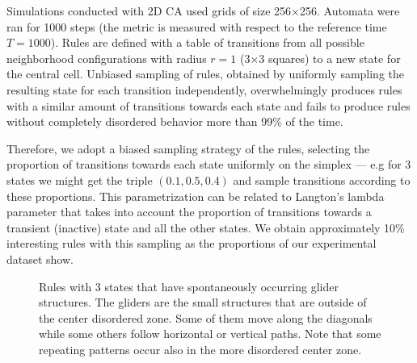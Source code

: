Simulations conducted with 2D CA used grids of size 256$\times$256. Automata
were ran for 1000 steps (the metric is measured with respect to the reference
time $T = 1000$). Rules are defined with a table of transitions from all
possible neighborhood configurations with radius $r=1$ (3$\times$3 squares) to a
new state for the central cell. Unbiased sampling of rules, obtained by
uniformly sampling the resulting state for each transition independently,
overwhelmingly produces rules with a similar amount of transitions towards each
state and fails to produce rules without completely disordered behavior more
than 99\% of the time.

Therefore, we adopt a biased sampling strategy of the rules, selecting the
proportion of transitions towards each state uniformly on the simplex --- e.g
for 3 states we might get the triple $(0.1, 0.5, 0.4)$ and sample transitions
according to these proportions. This parametrization can be related to Langton's
lambda parameter \parencite{langtonComputationEdgeChaos1990} that takes into account the
proportion of transitions towards a transient (inactive) state and all the other
states. We obtain approximately 10\% interesting rules with this sampling as the
proportions of our experimental dataset show.

\begin{figure}[t]
  \centering
  \hfil
  \caption{Rules with 3 states that have spontaneously occurring glider
    structures. The gliders are the small structures that are outside of the
    center disordered zone. Some of them move along the diagonals while some
    others follow horizontal or vertical paths. Note that some repeating
    patterns occur also in the more disordered center zone.}
  \label{fig:gliders}
\end{figure}

